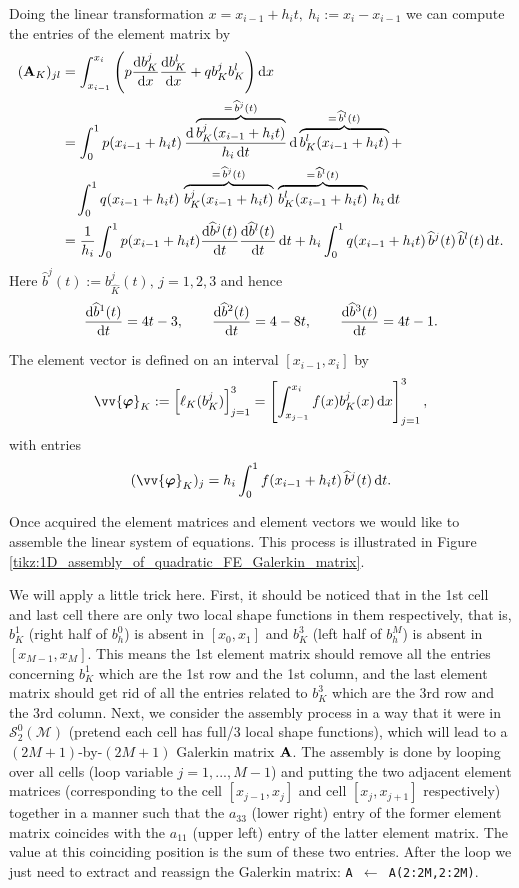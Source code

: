 	Doing the linear transformation $x=x_{i-1}+h_i t,\ h_i:=x_i-x_{i-1}$ 
	we can compute the entries of the element matrix by
	\begin{align*}
		(\mathbf{A}_K)_{jl}&=\int_{x_{i-1}}^{x_i}\left(	
		p\frac{\mathrm{d} b_K^j}{\mathrm{d} x}\frac{\mathrm{d} b_K^l}{\mathrm{d} x}+
		q b_K^j b_K^l\right)\mathrm{d} x\\
		&=\int_{0}^{1} p(x_{i-1}+h_i t)\,
		\frac{\mathrm{d}\overbrace{b_K^j(x_{i-1}+h_i t)}^{
				=\,\widehat{b}^j(t)}}{h_i\,\mathrm{d} t}\,
		\mathrm{d}\overbrace{b_K^l(x_{i-1}+h_i t)}^{=\,\widehat{b}^l(t)}+\\
		&\quad\int_{0}^{1}q(x_{i-1}+h_i t)\,
		\overbrace{b_K^j(x_{i-1}+h_i t)}^{=\,\widehat{b}^j(t)}\,
		\overbrace{b_K^l(x_{i-1}+h_i t)}^{=\,\widehat{b}^l(t)}\, h_i\,\mathrm{d} t\\
		&=\frac{1}{h_i}\int_{0}^{1} p(x_{i-1}+h_i t)
		\frac{\mathrm{d}\widehat{b}^j(t)}{\mathrm{d} t}\frac{\mathrm{d}\widehat{b}^l(t)}{\mathrm{d} t}\,
		\mathrm{d} t+h_i\int_{0}^{1} q(x_{i-1}+h_i t)\,
		\widehat{b}^j(t)\,\widehat{b}^l(t)\,\mathrm{d} t.
	\end{align*}
	Here $\widehat{b}^j(t):=b_{\widehat{K}}^j(t),\,j=1,2,3$ and hence
	\[\frac{\mathrm{d}\widehat{b}^1(t)}{\mathrm{d} t}=4t-3,\qquad
	\frac{\mathrm{d}\widehat{b}^2(t)}{\mathrm{d} t}=4-8t,\qquad
	\frac{\mathrm{d}\widehat{b}^3(t)}{\mathrm{d} t}=4t-1.\]
	
	The element vector is defined on an interval $[x_{i-1},x_i]$ by
	\[\vv{\bm{\varphi}}_K:=\left[\ell_K(b_K^j)\right]_{j=1}^{3}=
	\left[\int_{x_{j-1}}^{x_i}f(x)b_K^j(x)\,\rd x \right]_{j=1}^{3},\]	
	with entries
	\[(\vv{\bm{\varphi}}_K)_j=
	h_i\int_{0}^{1} f(x_{i-1}+h_i t)\,\widehat{b}^j(t)\,\rd t.\]
	
	Once acquired the element matrices and element vectors we would like to 
	assemble the linear system of equations. This process is illustrated in
	Figure \ref{tikz:1D_assembly_of_quadratic_FE_Galerkin_matrix}. 
	
	We will apply a little trick here. First, it should be noticed that in the 
	1st cell and last cell there are only two local shape functions in them 
	respectively, that is, $b_K^1$ (right half of $b_h^0$) is absent in 
	$[x_0,x_1]$ and $b_K^3$ (left half of $b_h^M$) is absent in $[x_{M-1},x_M]$.
	This means the 1st element matrix should remove all the entries 
	concerning $b_K^1$ which are the 1st row and the 1st column, and the
	last element matrix should get rid of all the entries related to $b_K^3$
	which are the 3rd row and the 3rd column. Next, we consider the assembly
	process in a way that it were in $\mathcal{S}_{2}^{0}(\mathcal{M})$ 
	(pretend each cell has full/3 local shape functions), which will lead to
	a $(2M+1)$-by-$(2M+1)$ Galerkin matrix $\mathbf{A}$. The assembly is done by
	looping over all cells (loop variable $j=1,...,M-1$) and putting the two 
	adjacent element matrices (corresponding to the cell $[x_{j-1},x_j]$ and
	cell $[x_j,x_{j+1}]$ respectively) together	in a manner such that the 
	$a_{33}$ (lower right) entry of the former element matrix coincides with
	the $a_{11}$ (upper left) entry of the latter element matrix. The value at
	this coinciding position is the sum of these two entries. After the loop
	we just need to extract and reassign the Galerkin matrix: 
	\texttt{A $\gets$ A(2:2M,2:2M)}.
	
